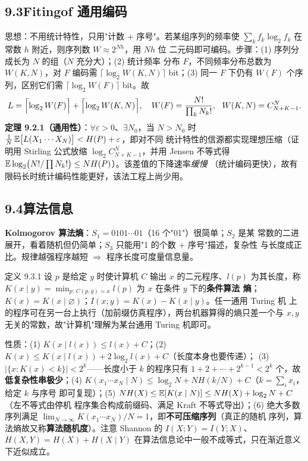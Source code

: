 \subsection{9.3\quad Fitingof 通用编码}

思想：不用统计特性，只用"计数 + 序号"。若某组序列的频率使
$\sum_kf_k\log_2f_k$ 在常数 $h$ 附近，则序列数 $W\approx2^{Nh}$，用 $Nh$ 位
二元码即可编码。步骤：(1) 序列分成长为 $N$ 的组（$N$ 充分大）；(2) 统计频率
分布 $F$，不同频率分布总数为 $W(K,N)$，对 $F$ 编码需
$\lceil\log_2W(K,N)\rceil$ bit；(3) 同一 $F$ 下仍有 $W(F)$ 个序列，区别它们需
$\lceil\log_2W(F)\rceil$ bit。故
\begin{align*}
L=\Bigl\lceil\log_2W(F)\Bigr\rceil+\Bigl\lceil\log_2W(K,N)\Bigr\rceil,\quad
W(F)=\frac{N!}{\prod_kN_k!},\ \
W(K,N)=C_{N+K-1}^{N}.
\end{align*}
\textbf{定理 9.2.1（通用性）}：$\forall\varepsilon>0$、$\exists N_0$，当
$N>N_0$ 时 $\frac1N\operatorname{\mathbb{E}}\bigl[L(X_1\cdots X_N)\bigr]<H(P)+\varepsilon$，即对不同
统计特性的信源都实现理想压缩（证明用 Stirling 公式放缩
$\log_2C_{N+K-1}^{N}$，并用 Jensen 不等式得
$\operatorname{\mathbb{E}}\log_2\bigl(N!/\prod N_k!\bigr)\le NH(P)$）。该差值的下降速率\emph{缓慢}
（统计编码更快），故有限码长时统计编码性能更好，该法工程上尚少用。

\subsection{9.4\quad 算法信息}

\textbf{Kolmogorov 算法熵}：$S_1=0101\cdots01$（16 个"01"）很简单；$S_2$ 是某
常数的二进展开，看着随机但仍简单；$S_3$ 只能用"1 的个数 + 序号"描述，复杂性
与长度成正比。规律越强程序越短 $\Rightarrow$ 程序长度可度量信息量。

\begin{defbox}{定义 9.3.1}
设 $p$ 是给定 $y$ 时使计算机 $C$ 输出 $x$ 的二元程序、$l(p)$ 为其长度，称
$K(x\mid y)=\min_{p:\,C(p,y)=x}l(p)$ 为 $x$ 在条件 $y$ 下的\textbf{条件算法
熵}；$K(x)=K(x\mid\varnothing)$；$I(x;y)=K(x)-K(x\mid y)$。任一通用 Turing 机
上的程序可在另一台上执行（加前缀仿真程序），两台机器算得的熵只差一个与
$x,y$ 无关的常数，故"计算机"理解为某台通用 Turing 机即可。
\end{defbox}

性质：(1) $K(x\mid l(x))\le l(x)+C$；(2)
$K(x)\le K(x\mid l(x))+2\log_2l(x)+C$（长度本身也要传递）；
(3) $|\{x:K(x)<k\}|<2^{k}$——长度小于 $k$ 的程序只有
$1+2+\cdots+2^{k-1}<2^{k}$ 个，故\textbf{低复杂性串极少}；(4)
$K(x_1\cdots x_N\mid N)\le\log_2N+NH(k/N)+C$（$k=\sum_ix_i$，给定 $k$ 与序号
即可复现）；(5) $NH(X)\le\operatorname{\mathbb{E}}[K(x\mid N)]\le NH(X)+\log_2N+C$（左不等式由停机
程序集合构成前缀码、满足 Kraft 不等式导出）；(6) 绝大多数序列满足
$\lim_{N\to\infty}K(x_1\cdots x_N)/N=1$，即\textbf{不可压缩序列}（真正的随机
序列，算法熵故又称\textbf{算法随机度}）。注意 Shannon 的 $I(X;Y)=I(Y;X)$、
$H(X,Y)=H(X)+H(X\mid Y)$ 在算法信息论中一般不成等式，只在渐近意义下近似成立。

